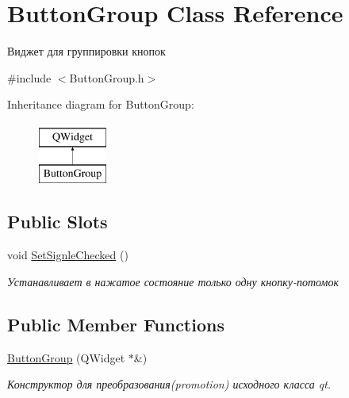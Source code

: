 \hypertarget{class_button_group}{}\section{Button\+Group Class Reference}
\label{class_button_group}


Виджет для группировки кнопок  




{\ttfamily \#include $<$Button\+Group.\+h$>$}

Inheritance diagram for Button\+Group\+:\begin{figure}[H]
\begin{center}
\leavevmode
\includegraphics[height=2.000000cm]{class_button_group}
\end{center}
\end{figure}
\subsection*{Public Slots}
\begin{DoxyCompactItemize}
\item 
\mbox{\label{class_button_group_a6e3b11b69baf3b3f0ee1584ba2da4a8b}} 
void \mbox{\hyperlink{class_button_group_a6e3b11b69baf3b3f0ee1584ba2da4a8b}{Set\+Signle\+Checked}} ()
\begin{DoxyCompactList}\small\item\em Устанавливает в нажатое состояние только одну кнопку-\/потомок \end{DoxyCompactList}\end{DoxyCompactItemize}
\subsection*{Public Member Functions}
\begin{DoxyCompactItemize}
\item 
\mbox{\hyperlink{class_button_group_a849b8949696a16eb6b17cc630f860e8e}{Button\+Group}} (Q\+Widget $\ast$\&)
\begin{DoxyCompactList}\small\item\em Конструктор для преобразования(promotion) исходного класса qt. \end{DoxyCompactList}\end{DoxyCompactItemize}


